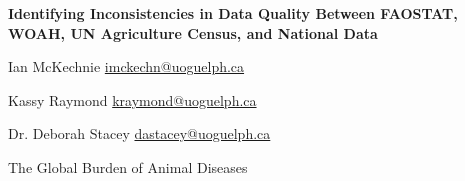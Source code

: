 \begin{titlepage} 
    \title{}
    \centering 
    \vspace*{1in} 
    \begin{Large}\bfseries 
    Identifying Inconsistencies in Data Quality Between FAOSTAT, WOAH, UN Agriculture Census, and National Data\par 

    \vspace{2in} 
    Ian McKechnie \href{mailto:imckechn@uoguelph.ca}{imckechn@uoguelph.ca}

    Kassy Raymond \href{mailto:kraymond@uoguelph.ca}{kraymond@uoguelph.ca}

    Dr. Deborah Stacey \href{mailto:dastacey@uoguelph.ca}{dastacey@uoguelph.ca}

    \vspace{3in} 
    The Global Burden of Animal Diseases
    
    \end{Large} 
    \vspace{1.5in} 
    \vfill 
    \par 
    

    \par 
\end{titlepage} 





